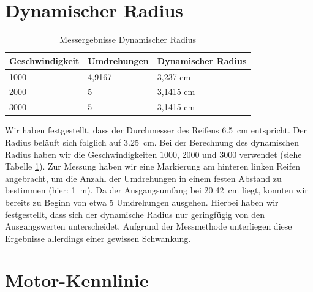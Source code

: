 \documentclass[10pt]{article}
\begin{document}
\section{Dynamischer Radius}
    \begin{table}[bthp]
        \caption{Messergebnisse Dynamischer Radius}
        \label{tab:dynamicradius}
        \centering
        \begin{tabular}{|l|l|l|}
        Geschwindigkeit & Umdrehungen & Dynamischer Radius \\ \hline
        1000            & 4,9167      & 3,237 cm           \\
        2000            & 5           & 3,1415 cm          \\
        3000            & 5           & 3,1415 cm
        \end{tabular}
    \end{table}
    Wir haben festgestellt, dass der Durchmesser des Reifens \SI{6,5}{\cm} entspricht.
    Der Radius beläuft sich folglich auf \SI{3,25}{\cm}.
    Bei der Berechnung des dynamischen Radius haben wir die Geschwindigkeiten $1000$, $2000$ und $3000$ verwendet (siehe Tabelle \ref{tab:dynamicradius}).
    Zur Messung haben wir eine Markierung am hinteren linken Reifen angebracht, um die Anzahl der Umdrehungen in einem festen Abstand zu bestimmen (hier: \SI{1}{m}).
    Da der Ausgangsumfang bei \SI{20,42}{\cm} liegt, konnten wir bereits zu Beginn von etwa 5 Umdrehungen ausgehen.
    Hierbei haben wir festgestellt, dass sich der dynamische Radius nur geringfügig von den Ausgangswerten unterscheidet.
    Aufgrund der Messmethode unterliegen diese Ergebnisse allerdings einer gewissen Schwankung.

\section{Motor-Kennlinie}
\end{document}
